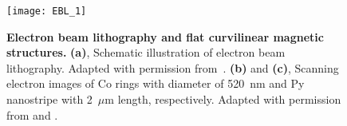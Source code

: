 %
%

\begin{figure}[t]
	\centering
	\texttt{[image: EBL\_1]}
	\caption{\label{fig:EBL_schematics}%
		\textbf{Electron beam lithography and flat curvilinear magnetic structures.} \textbf{(a)}, Schematic illustration of electron beam lithography. Adapted with permission from~\cite{Pimpin12}. \textbf{(b)} and  \textbf{(c)}, Scanning electron images of Co rings with diameter of 520~nm and Py nanostripe with 2~$\mu$m length, respectively. Adapted with permission from \cite{Castano03} and \cite{Volkov19c}.  
	}
\end{figure}


